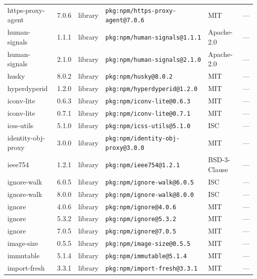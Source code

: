 \documentclass[11pt,a4paper]{article}
\begin{document}
\begin{longtable}{|p{4cm}|p{2cm}|p{1.6cm}|p{5cm}|p{1.5cm}|p{3.5cm}|}
\raggedright https-proxy-agent & 7.0.6 & library & \small\texttt{pkg:npm/https-proxy-agent@7.0.6} & MIT & \small — \\
\raggedright human-signals & 1.1.1 & library & \small\texttt{pkg:npm/human-signals@1.1.1} & Apache-2.0 & \small — \\
\raggedright human-signals & 2.1.0 & library & \small\texttt{pkg:npm/human-signals@2.1.0} & Apache-2.0 & \small — \\
\raggedright husky & 8.0.2 & library & \small\texttt{pkg:npm/husky@8.0.2} & MIT & \small — \\
\raggedright hyperdyperid & 1.2.0 & library & \small\texttt{pkg:npm/hyperdyperid@1.2.0} & MIT & \small — \\
\raggedright iconv-lite & 0.6.3 & library & \small\texttt{pkg:npm/iconv-lite@0.6.3} & MIT & \small — \\
\raggedright iconv-lite & 0.7.1 & library & \small\texttt{pkg:npm/iconv-lite@0.7.1} & MIT & \small — \\
\raggedright icss-utils & 5.1.0 & library & \small\texttt{pkg:npm/icss-utils@5.1.0} & ISC & \small — \\
\raggedright identity-obj-proxy & 3.0.0 & library & \small\texttt{pkg:npm/identity-obj-proxy@3.0.0} & MIT & \small — \\
\raggedright ieee754 & 1.2.1 & library & \small\texttt{pkg:npm/ieee754@1.2.1} & BSD-3-Clause & \small — \\
\raggedright ignore-walk & 6.0.5 & library & \small\texttt{pkg:npm/ignore-walk@6.0.5} & ISC & \small — \\
\raggedright ignore-walk & 8.0.0 & library & \small\texttt{pkg:npm/ignore-walk@8.0.0} & ISC & \small — \\
\raggedright ignore & 4.0.6 & library & \small\texttt{pkg:npm/ignore@4.0.6} & MIT & \small — \\
\raggedright ignore & 5.3.2 & library & \small\texttt{pkg:npm/ignore@5.3.2} & MIT & \small — \\
\raggedright ignore & 7.0.5 & library & \small\texttt{pkg:npm/ignore@7.0.5} & MIT & \small — \\
\raggedright image-size & 0.5.5 & library & \small\texttt{pkg:npm/image-size@0.5.5} & MIT & \small — \\
\raggedright immutable & 5.1.4 & library & \small\texttt{pkg:npm/immutable@5.1.4} & MIT & \small — \\
\raggedright import-fresh & 3.3.1 & library & \small\texttt{pkg:npm/import-fresh@3.3.1} & MIT & \small — \\

\end{longtable}
\end{document}
